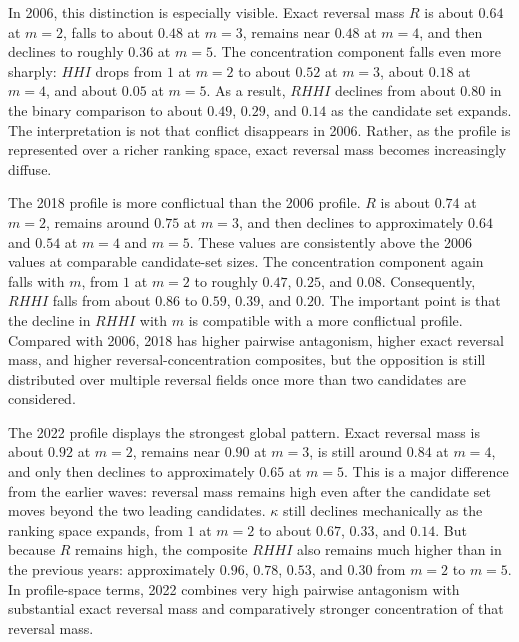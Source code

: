 \documentclass[12pt]{article}
\begin{document}
In 2006, this distinction is especially visible. Exact reversal mass \(R\) is about \(0.64\) at \(m=2\), falls to about \(0.48\) at \(m=3\), remains near \(0.48\) at \(m=4\), and then declines to roughly \(0.36\) at \(m=5\). The concentration component falls even more sharply: \(HHI\) drops from \(1\) at \(m=2\) to about \(0.52\) at \(m=3\), about \(0.18\) at \(m=4\), and about \(0.05\) at \(m=5\). As a result, \(RHHI\) declines from about \(0.80\) in the binary comparison to about \(0.49\), \(0.29\), and \(0.14\) as the candidate set expands. The interpretation is not that conflict disappears in 2006. Rather, as the profile is represented over a richer ranking space, exact reversal mass becomes increasingly diffuse.

The 2018 profile is more conflictual than the 2006 profile. \(R\) is about \(0.74\) at \(m=2\), remains around \(0.75\) at \(m=3\), and then declines to approximately \(0.64\) and \(0.54\) at \(m=4\) and \(m=5\). These values are consistently above the 2006 values at comparable candidate-set sizes. The concentration component again falls with \(m\), from \(1\) at \(m=2\) to roughly \(0.47\), \(0.25\), and \(0.08\). Consequently, \(RHHI\) falls from about \(0.86\) to \(0.59\), \(0.39\), and \(0.20\). The important point is that the decline in \(RHHI\) with \(m\) is compatible with a more conflictual profile. Compared with 2006, 2018 has higher pairwise antagonism, higher exact reversal mass, and higher reversal-concentration composites, but the opposition is still distributed over multiple reversal fields once more than two candidates are considered.

The 2022 profile displays the strongest global pattern. Exact reversal mass is about \(0.92\) at \(m=2\), remains near \(0.90\) at \(m=3\), is still around \(0.84\) at \(m=4\), and only then declines to approximately \(0.65\) at \(m=5\). This is a major difference from the earlier waves: reversal mass remains high even after the candidate set moves beyond the two leading candidates. \(\kappa\) still declines mechanically as the ranking space expands, from \(1\) at \(m=2\) to about \(0.67\), \(0.33\), and \(0.14\). But because \(R\) remains high, the composite \(RHHI\) also remains much higher than in the previous years: approximately \(0.96\), \(0.78\), \(0.53\), and \(0.30\) from \(m=2\) to \(m=5\). In profile-space terms, 2022 combines very high pairwise antagonism with substantial exact reversal mass and comparatively stronger concentration of that reversal mass.
\end{document}
